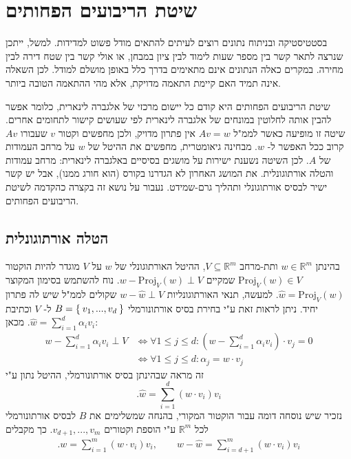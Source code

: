 \documentclass[12pt]{report}
\theoremstyle{plain}
\theoremstyle{definition}
\newcommand{\R}{\mathbb{R}}
\newcommand{\0}{\mathbf{0}}
\begin{document}
\section{שיטת הריבועים הפחותים}

בסטטיסטיקה ובניתוח נתונים רוצים לעיתים להתאים מודל פשוט למדידות. למשל, ייתכן שנרצה לתאר קשר בין מספר שעות לימוד לבין ציון במבחן, או אולי קשר בין שטח דירה לבין מחירה. במקרים כאלה הנתונים אינם מתאימים בדרך כלל באופן מושלם למודל. לכן השאלה אינה תמיד האם קיימת התאמה מדויקת, אלא מהי ההתאמה הטובה ביותר.

שיטת הריבועים הפחותים היא קודם כל יישום מרכזי של אלגברה לינארית, כלומר אפשר להבין אותה לחלוטין במונחים של אלגברה לינארית לפי שעושים קישור לתחומים אחרים. שיטה זו מופיעה כאשר לממ"ל
$Av=w$
אין פתרון מדויק, ולכן מחפשים וקטור
$v$
שעבורו
$Av$
קרוב ככל האפשר ל-
$w$.
מבחינה גיאומטרית, מחפשים את ההיטל של
$w$
על מרחב העמודות של
$A$.
לכן השיטה נשענת ישירות על מושגים בסיסיים באלגברה לינארית: מרחב עמודות והטלה אורתוגונלית. את המושג האחרון לא הגדרנו בקורס (הוא חורג ממנו), אבל יש קשר ישיר לבסיס אורתוגונלי ותהליך גרם-שמידט. נעבור על נושא זה בקצרה כהקדמה לשיטת הריבועים הפחותים.

\subsection*{הטלה אורתוגונלית}

בהינתן 
$w\in\R^m$
ותת-מרחב
$V\subseteq\R^m$,
ההיטל האורתוגונלי של
$w$
על
$V$
מוגדר להיות הוקטור
$\text{Proj}_V(w)\in V$
שמקיים
$w-\text{Proj}_V(w)\perp V$.
נוח להשתמש בסימון המקוצר
$\hat{w}=\text{Proj}_V(w)$.
למעשה, תנאי האורתוגונליות 
$w-\hat{w}\perp V$
שקולים לממ"ל שיש לה פתרון יחיד. ניתן לראות זאת ע"י בחירת בסיס אורתונורמלי
$B=\Set{v_1,...,v_d}$
ל-
$V$
וכתיבת
$\hat{w}=\sum_{i=1}^d\alpha_iv_i$.
מכאן:
$$
\begin{aligned}
w-\sum_{i=1}^d \alpha_iv_i\perp V &\iff \forall 1\leq j\leq d : \left(w-\sum_{i=1}^d \alpha_iv_i\right)\cdot v_j=0 \\
& \iff \forall 1\leq j\leq d : \alpha_j=w\cdot v_j
\end{aligned}
$$
זה מראה שבהינתן בסיס אורתונורמלי, ההיטל נתון ע"י 
$$
.\hat{w}=\sum_{i=1}^d(w\cdot v_i)v_i
$$
נזכיר שיש נוסחה דומה עבור הוקטור המקורי, בהנחה שמשלימים את 
$B$
לבסיס אורתונורמלי לכל
$\R^m$
ע"י הוספת וקטורים
$v_{d+1},...,v_m$.
כך מקבלים
$$
\begin{aligned}
.w=\sum_{i=1}^m(w\cdot v_i)v_i, \qquad w-\hat{w}=\sum_{i=d+1}^m(w\cdot v_i)v_i
\end{aligned}
$$
\end{document}
